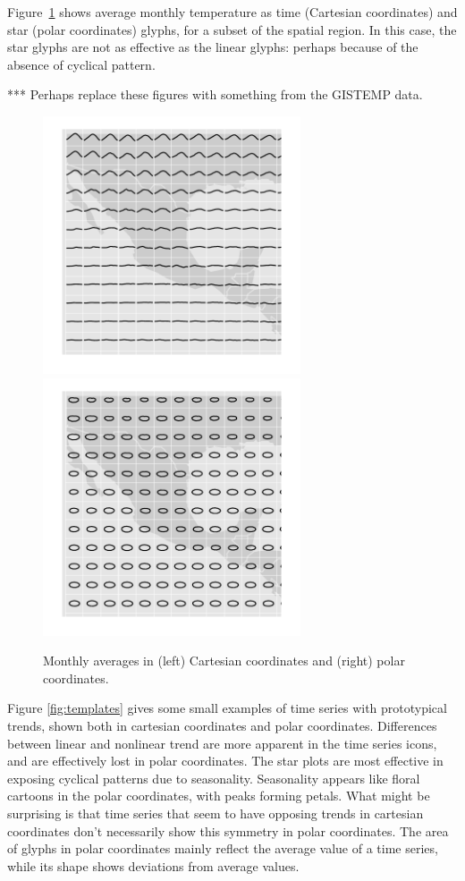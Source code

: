\documentclass[oneside]{article}
\begin{document}
Figure~\ref{fig:cycle} shows average monthly temperature as time (Cartesian coordinates) and star (polar coordinates) glyphs, for a subset of the spatial region. In this case, the star glyphs are not as effective as the linear glyphs: perhaps because of the absence of cyclical pattern.

*** Perhaps replace these figures with something from the GISTEMP data.

\begin{figure}[htbp]
  \centering
  \includegraphics[width=3in]{month-cartesian}
  \includegraphics[width=3in]{month-polar}
    
  \caption{Monthly averages in (left) Cartesian coordinates and (right) polar coordinates.}
  
  \label{fig:cycle}
\end{figure}


Figure \ref{fig:templates} gives some small examples of time series with prototypical trends, shown both in cartesian coordinates and polar coordinates. Differences between linear and nonlinear trend are more apparent in the time series icons, and are effectively lost in polar coordinates. The star plots are most effective in exposing cyclical patterns due to seasonality. Seasonality appears like floral cartoons in the polar coordinates, with peaks forming petals. What might be surprising is that time series that seem to have opposing trends in cartesian coordinates don't necessarily show this symmetry in polar coordinates. The area of glyphs in polar coordinates mainly reflect the average value of a time series, while its shape shows deviations from average values. 
\end{document}
